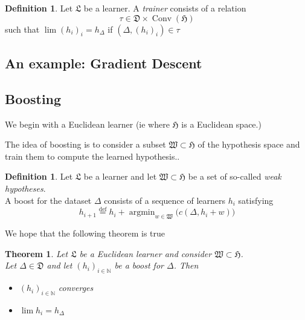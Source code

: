 \documentclass{book}
\theoremstyle{plain}
\newtheorem{theorem}[corollary]{Theorem}
\theoremstyle{definition}
\newtheorem{definition}[corollary]{Definition}
\DeclareMathOperator{\argmin}{argmin}
\DeclareMathOperator{\Conv}{Conv}
\renewcommand{\d}[1]{\mathbb{#1}}
\newcommand{\define}{\stackrel{\operatorname{def}}{=}}
\newcommand{\f}[1]{\mathfrak{#1}}
\begin{document}
\begin{definition}
Let $\f{L}$ be a learner. A \emph{trainer} consists of a relation
\[
\tau \in \f{D}\times \Conv(\f{H})
\]
such that $\lim (h_i)_i =h_\Delta$ if $(\Delta,(h_i)_i)\in \tau$
\end{definition}
\subsection{An example: Gradient Descent}

\subsection{Boosting}

We begin with a Euclidean learner (ie where $\f{H}$ is a Euclidean space.)

The idea of boosting is to consider a subset $\f{W}\subset \f{H}$ of the hypothesis space and train them to compute the learned hypothesis..

\begin{definition}
Let $\f{L}$ be a learner and let $\f{W}\subset \f{H}$ be a set of so-called \emph{weak hypotheses}.\\
A boost for the dataset $\Delta $ consists of a sequence of learners $h_i$ satisfying
\[
h_{i+1} \define h_i+\argmin_{w\in \f{W}}\bigg(c(\Delta, h_i+w)\bigg)
\]
\end{definition}

\noindent We hope that the following theorem is true

\begin{theorem}
Let $\f{L}$ be a Euclidean learner and consider $\f{W}\subset \f{H}$.\\ Let $\Delta \in \f{D}$ and let $(h_i)_{i \in \d{N}}$ be a boost for $\Delta$. Then 
\begin{itemize}
\item $(h_i)_{i \in \d{N}}$ converges
\item $\lim h_i = h_\Delta$
\end{itemize}
\end{theorem}
\end{document}
